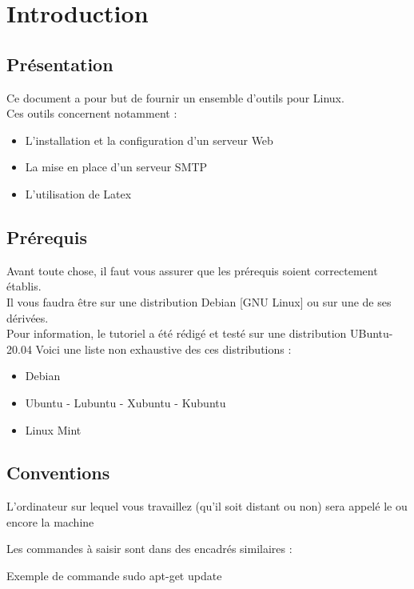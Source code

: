 \chapter{Introduction}     

\section{Présentation}

Ce document a pour but de fournir un ensemble d'outils pour Linux. \\
Ces outils concernent notamment : 

\begin{itemize}

    \item L'installation et la configuration d'un serveur Web
    \item La mise en place d'un serveur SMTP
    \item L'utilisation de Latex

\end{itemize}


\section{Prérequis}
Avant toute chose, il faut vous assurer que les prérequis soient correctement établis. \\

Il vous faudra être sur une distribution Debian [GNU Linux] ou sur une de ses dérivées.\\

Pour information, le tutoriel a été rédigé et testé sur une distribution UBuntu-20.04
Voici une liste non exhaustive des ces distributions :
\begin{itemize}
    \item Debian
    \item Ubuntu - Lubuntu - Xubuntu - Kubuntu
    \item Linux Mint
\end{itemize}



\section{Conventions}

L’ordinateur sur lequel vous travaillez (qu’il soit distant ou non) sera appelé le  ou encore la machine

Les commandes à saisir sont dans des encadrés similaires : \\
\begin{Bash}{Exemple de commande}
sudo apt-get update
\end{Bash}

